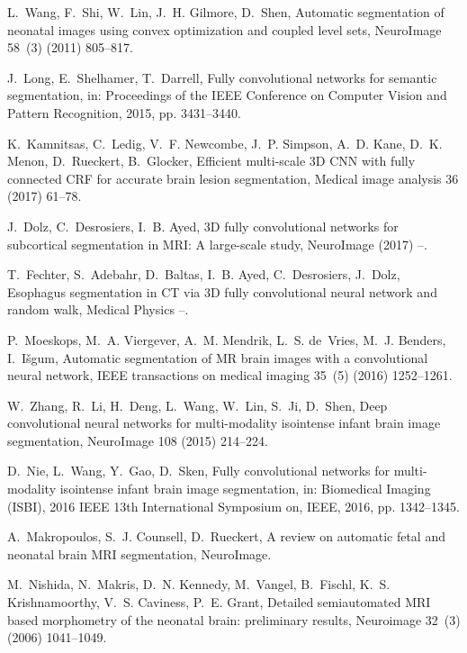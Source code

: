 \documentclass[twoside,espcrc2]{elsarticle}
\begin{document}
\begin{thebibliography}{10}
L.~Wang, F.~Shi, W.~Lin, J.~H. Gilmore, D.~Shen, Automatic segmentation of
  neonatal images using convex optimization and coupled level sets, NeuroImage
  58~(3) (2011) 805--817.

J.~Long, E.~Shelhamer, T.~Darrell, Fully convolutional networks for semantic
  segmentation, in: Proceedings of the IEEE Conference on Computer Vision and
  Pattern Recognition, 2015, pp. 3431--3440.

K.~Kamnitsas, C.~Ledig, V.~F. Newcombe, J.~P. Simpson, A.~D. Kane, D.~K. Menon,
  D.~Rueckert, B.~Glocker, Efficient multi-scale {3D} {CNN} with fully
  connected {CRF} for accurate brain lesion segmentation, Medical image
  analysis 36 (2017) 61--78.

J.~Dolz, C.~Desrosiers, I.~B. Ayed, {3D} fully convolutional networks for
  subcortical segmentation in {MRI}: A large-scale study, NeuroImage (2017) --.

T.~Fechter, S.~Adebahr, D.~Baltas, I.~B. Ayed, C.~Desrosiers, J.~Dolz,
  Esophagus segmentation in {CT} via
  {3D} fully convolutional neural network and random walk, Medical Physics --.


P.~Moeskops, M.~A. Viergever, A.~M. Mendrik, L.~S. de~Vries, M.~J. Benders,
  I.~I{\v{s}}gum, Automatic segmentation of {MR} brain images with a
  convolutional neural network, IEEE transactions on medical imaging 35~(5)
  (2016) 1252--1261.

W.~Zhang, R.~Li, H.~Deng, L.~Wang, W.~Lin, S.~Ji, D.~Shen, Deep convolutional
  neural networks for multi-modality isointense infant brain image
  segmentation, NeuroImage 108 (2015) 214--224.

D.~Nie, L.~Wang, Y.~Gao, D.~Sken, Fully convolutional networks for
  multi-modality isointense infant brain image segmentation, in: Biomedical
  Imaging (ISBI), 2016 IEEE 13th International Symposium on, IEEE, 2016, pp.
  1342--1345.

A.~Makropoulos, S.~J. Counsell, D.~Rueckert, A review on automatic fetal and
  neonatal brain {MRI} segmentation, NeuroImage.

M.~Nishida, N.~Makris, D.~N. Kennedy, M.~Vangel, B.~Fischl, K.~S.
  Krishnamoorthy, V.~S. Caviness, P.~E. Grant, Detailed semiautomated {MRI}
  based morphometry of the neonatal brain: preliminary results, Neuroimage
  32~(3) (2006) 1041--1049.


\end{thebibliography}
\end{document}
